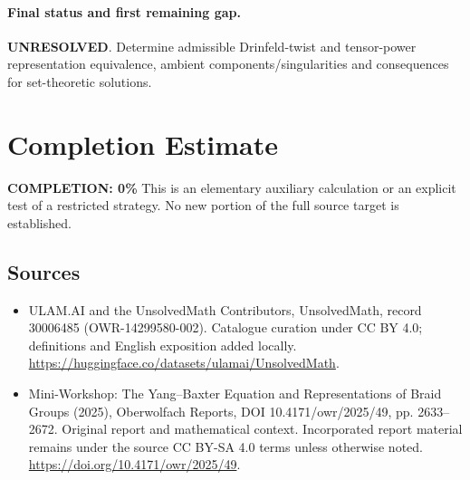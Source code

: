 \documentclass[11pt]{article}
\begin{document}
\paragraph{Final status and first remaining gap.}
\textbf{UNRESOLVED}. Determine admissible Drinfeld-twist and tensor-power representation equivalence, ambient components/singularities and consequences for set-theoretic solutions.

\section{Completion Estimate}
\noindent\textbf{COMPLETION: 0\%}
This is an elementary auxiliary calculation or an explicit test of a restricted strategy. No new portion of the full source target is established.

\subsection{Sources}
\begin{itemize}
\item[\hypertarget{source:30006485:1}{S1}] ULAM.AI and the UnsolvedMath Contributors, UnsolvedMath, record 30006485 (OWR-14299580-002). Catalogue curation under CC BY 4.0; definitions and English exposition added locally.
\url{https://huggingface.co/datasets/ulamai/UnsolvedMath}.
\item[\hypertarget{source:30006485:2}{S2}] Mini-Workshop: The Yang–Baxter Equation and Representations of Braid Groups (2025), Oberwolfach Reports, DOI 10.4171/owr/2025/49, pp. 2633--2672. Original report and mathematical context. Incorporated report material remains under the source CC BY-SA 4.0 terms unless otherwise noted.
\url{https://doi.org/10.4171/owr/2025/49}.
\end{itemize}
\label{end:30006485}
\end{document}
